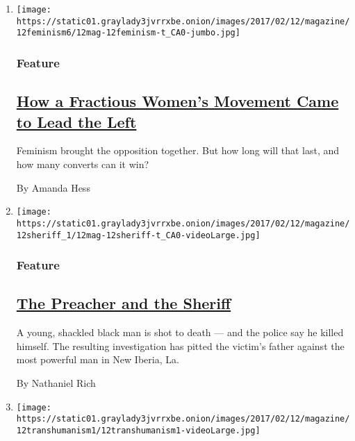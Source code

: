 \begin{enumerate}
\def\labelenumi{\arabic{enumi}.}
\item
  \texttt{[image: https://static01.graylady3jvrrxbe.onion/images/2017/02/12/magazine/12feminism6/12mag-12feminism-t\_CA0-jumbo.jpg]}

  \hypertarget{feature}{%
  \subsubsection{Feature}\label{feature}}

  \hypertarget{how-a-fractious-womens-movement-came-to-lead-the-left}{%
  \subsection{\texorpdfstring{\href{/2017/02/07/magazine/how-a-fractious-womens-movement-came-to-lead-the-left.html}{How
  a Fractious Women's Movement Came to Lead the
  Left}}{How a Fractious Women's Movement Came to Lead the Left}}\label{how-a-fractious-womens-movement-came-to-lead-the-left}}

  Feminism brought the opposition together. But how long will that last,
  and how many converts can it win?

  By Amanda Hess
\item
  \texttt{[image: https://static01.graylady3jvrrxbe.onion/images/2017/02/12/magazine/12sheriff\_1/12mag-12sheriff-t\_CA0-videoLarge.jpg]}

  \hypertarget{feature-1}{%
  \subsubsection{Feature}\label{feature-1}}

  \hypertarget{the-preacher-and-the-sheriff}{%
  \subsection{\texorpdfstring{\href{/2017/02/08/magazine/the-preacher-and-the-sheriff.html}{The
  Preacher and the
  Sheriff}}{The Preacher and the Sheriff}}\label{the-preacher-and-the-sheriff}}

  A young, shackled black man is shot to death --- and the police say he
  killed himself. The resulting investigation has pitted the victim's
  father against the most powerful man in New Iberia, La.

  By Nathaniel Rich
\item
  \texttt{[image: https://static01.graylady3jvrrxbe.onion/images/2017/02/12/magazine/12transhumanism1/12transhumanism1-videoLarge.jpg]}


\end{enumerate}
